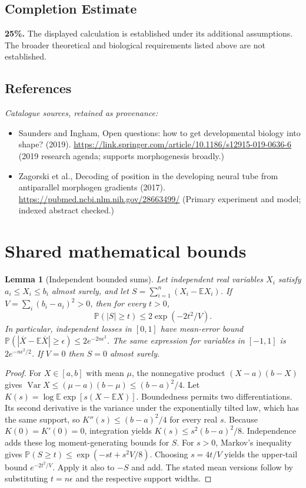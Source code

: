 \documentclass[11pt]{article}
\newcommand{\E}{\mathbb E}
\newcommand{\Prob}{\mathbb P}
\DeclareMathOperator{\Var}{Var}
\providecommand{\E}{\mathbb E}
\providecommand{\Prob}{\mathbb P}
\providecommand{\Var}{\operatorname{Var}}
\newtheorem{sharedlemma}{Lemma}[section]
\begin{document}
\subsection{Completion Estimate}
\textbf{25\%.} The displayed calculation is established under its additional assumptions. The broader theoretical and biological requirements listed above are not established.
\subsection{References}
\noindent\emph{Catalogue sources, retained as provenance:}
\begin{itemize}
\item Saunders and Ingham, Open questions: how to get developmental biology into shape? (2019). \url{https://link.springer.com/article/10.1186/s12915-019-0636-6} (2019 research agenda; supports morphogenesis broadly.)
\item Zagorski et al., Decoding of position in the developing neural tube from antiparallel morphogen gradients (2017). \url{https://pubmed.ncbi.nlm.nih.gov/28663499/} (Primary experiment and model; indexed abstract checked.)
\end{itemize}
\clearpage


\appendix
\section{Shared mathematical bounds}\label{app:bounds}
\begin{sharedlemma}[Independent bounded sums]\label{lem:bounded}
Let independent real variables $X_i$ satisfy $a_i\leq X_i\leq b_i$ almost surely,
and let $S=\sum_{i=1}^n(X_i-\E X_i)$. If
$V=\sum_i(b_i-a_i)^2>0$, then for every $t>0$,
\[
 \Prob(|S|\geq t)\leq 2\exp(-2t^2/V).
\]
In particular, independent losses in $[0,1]$ have mean-error bound
$\Prob(|\overline X-\E\overline X|\geq\epsilon)
\leq2e^{-2n\epsilon^2}$. The same expression for variables in $[-1,1]$
is $2e^{-n\epsilon^2/2}$. If $V=0$ then $S=0$ almost surely.
\end{sharedlemma}
\begin{proof}
For $X\in[a,b]$ with mean $\mu$, the nonnegative product
$(X-a)(b-X)$ gives
$\Var X\leq(\mu-a)(b-\mu)\leq(b-a)^2/4$.
Let $K(s)=\log\E\exp[s(X-\E X)]$.
Boundedness permits two differentiations. Its second derivative is the variance
under the exponentially tilted law, which has the same support, so
$K''(s)\leq(b-a)^2/4$ for every real $s$.
Because $K(0)=K'(0)=0$, integration yields
$K(s)\leq s^2(b-a)^2/8$.
Independence adds these log moment-generating bounds for $S$.
For $s>0$, Markov's inequality gives
$\Prob(S\geq t)\leq\exp(-st+s^2V/8)$.
Choosing $s=4t/V$ yields the upper-tail bound $e^{-2t^2/V}$.
Apply it also to $-S$ and add. The stated mean versions follow by substituting
$t=n\epsilon$ and the respective support widths.
\end{proof}
\end{document}
